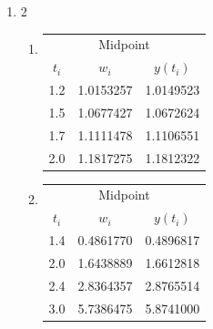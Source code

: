 \begin{posttest}
\begin{mysolution}
\begin{enumerate}[label=\arabic*.]
\item 
\begin{multicols}{2}
\begin{enumerate}[label=(\alph*)]
\item
\begin{center}
\begin{tabular}{ccc}
\hline
\multicolumn{3}{c}{Midpoint} \\
$t_{i}$ & $w_{i}$ & $y\left(t_{i}\right)$ \\
\hline
1.2 & 1.0153257 & 1.0149523 \\
1.5 & 1.0677427 & 1.0672624 \\
1.7 & 1.1111478 & 1.1106551 \\
2.0 & 1.1817275 & 1.1812322 \\
\hline
\end{tabular}
\end{center}
\item
\begin{center}
\begin{tabular}{ccc}
\hline
\multicolumn{3}{c}{Midpoint} \\
$t_{i}$ & $w_{i}$ & $y\left(t_{i}\right)$ \\
\hline
1.4 & 0.4861770 & 0.4896817 \\
2.0 & 1.6438889 & 1.6612818 \\
2.4 & 2.8364357 & 2.8765514 \\
3.0 & 5.7386475 & 5.8741000 \\
\hline
\end{tabular}
\end{center}

\end{enumerate}
\end{multicols}
\end{enumerate}
\end{mysolution}
\end{posttest}
